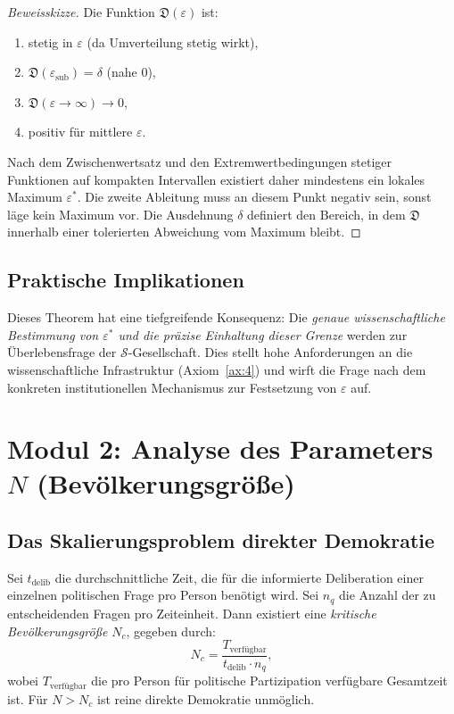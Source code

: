 \begin{proof}[Beweisskizze]
    Die Funktion $\mathfrak{D}(\varepsilon)$ ist:
    \begin{enumerate}
        \item stetig in $\varepsilon$ (da Umverteilung stetig wirkt),
        \item $\mathfrak{D}(\varepsilon_{\text{sub}}) = \delta$ (nahe 0),
        \item $\mathfrak{D}(\varepsilon \to \infty) \to 0$,
        \item positiv für mittlere $\varepsilon$.
    \end{enumerate}
    Nach dem Zwischenwertsatz und den Extremwertbedingungen stetiger Funktionen auf kompakten Intervallen existiert daher mindestens ein lokales Maximum $\varepsilon^*$. Die zweite Ableitung muss an diesem Punkt negativ sein, sonst läge kein Maximum vor. Die Ausdehnung $\delta$ definiert den Bereich, in dem $\mathfrak{D}$ innerhalb einer tolerierten Abweichung vom Maximum bleibt.
\end{proof}

\subsection{Praktische Implikationen}
Dieses Theorem hat eine tiefgreifende Konsequenz: Die \emph{genaue wissenschaftliche Bestimmung von $\varepsilon^*$ und die präzise Einhaltung dieser Grenze} werden zur Überlebensfrage der $\mathcal{S}$-Gesellschaft. Dies stellt hohe Anforderungen an die wissenschaftliche Infrastruktur (Axiom~\ref{ax:4}) und wirft die Frage nach dem konkreten institutionellen Mechanismus zur Festsetzung von $\varepsilon$ auf.

\section{Modul 2: Analyse des Parameters $N$ (Bevölkerungsgröße)}
\label{sec:modul_n}

\subsection{Das Skalierungsproblem direkter Demokratie}

\begin{theorem}
    Sei $t_{\text{delib}}$ die durchschnittliche Zeit, die für die informierte Deliberation einer einzelnen politischen Frage pro Person benötigt wird. Sei $n_q$ die Anzahl der zu entscheidenden Fragen pro Zeiteinheit. Dann existiert eine \emph{kritische Bevölkerungsgröße} $N_c$, gegeben durch:
    \[
    N_c = \frac{T_{\text{verfügbar}}}{t_{\text{delib}} \cdot n_q},
    \]
    wobei $T_{\text{verfügbar}}$ die pro Person für politische Partizipation verfügbare Gesamtzeit ist. Für $N > N_c$ ist reine direkte Demokratie unmöglich.
\end{theorem}

